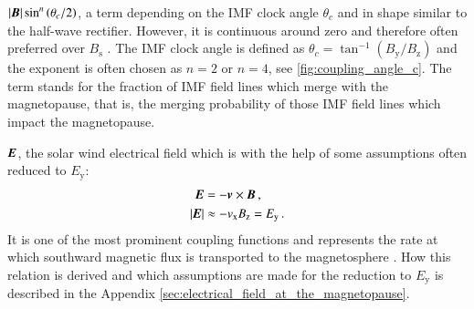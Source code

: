 \begin{itemize*}
	\item $|\boldsymbol{B}| \sin^n\left(\theta_c / 2\right)$, a term depending on the IMF clock angle $\theta_c$ and in shape similar to the half-wave rectifier. However, it is continuous around zero and therefore often preferred over $B_\text{s}$ \citep{Lockwood2013}. The IMF clock angle is defined as $\theta_c = \tan^{-1}\left(B_\text{y} / B_\text{z}\right)$ and the exponent is often chosen as $n = 2$ or $n = 4$, see \autoref{fig:coupling_angle_c}. The term stands for the fraction of IMF field lines which merge with the magnetopause, that is, the merging probability of those IMF field lines which impact the magnetopause.
	\begin{figure}[htb]
	\end{figure}
	
	\item $\boldsymbol{E}$, the solar wind electrical field which is with the help of some assumptions often reduced to $E_\text{y}$:
	\begin{align}
		\boldsymbol{E} &= -\boldsymbol{v} \times \boldsymbol{B}	\,,\\
		|\boldsymbol{E}| &\approx -v_\text{x} B_\text{z} =  E_\text{y}	\,.	\label{eq:coupling_vxBz}
	\end{align}
	It is one of the most prominent coupling functions and represents the rate at which southward magnetic flux is transported to the magnetosphere \citep[p.~103]{Russell2007}. How this relation is derived and which assumptions are made for the reduction to $E_\text{y}$ is described in the Appendix \autoref{sec:electrical_field_at_the_magnetopause}.
	

\end{itemize*}
